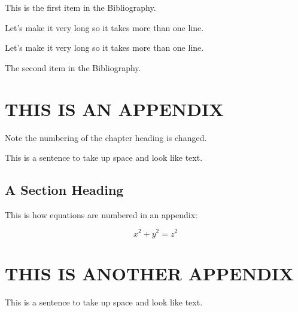 \documentclass{thesis}
\begin{document}

\begin{singlespace}

\begin{thebibliography}{99}

 This is the first item in the Bibliography.

Let's make it very long so it takes more than one line.

Let's make it very long so it takes more than one line.

 The second item in the Bibliography.

\end{thebibliography}

\end{singlespace}




\appendix    %


\chapter{THIS IS AN APPENDIX}

Note the numbering of the chapter heading is changed.

This is a sentence to take up space and look like text.

\section{A Section Heading}

This is how equations are numbered in an appendix:

\begin{equation}

x^2 + y^2 = z^2

\end{equation} 



\chapter{THIS IS ANOTHER APPENDIX}

This is a sentence to take up space and look like text.
\end{document}

